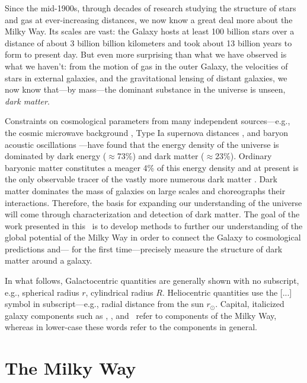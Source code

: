 Since the mid-1900s, through decades of research studying the structure of stars
and gas at ever-increasing distances, we now know a great deal more about the
Milky Way. Its scales are vast: the Galaxy hosts at least 100 billion stars over
a distance of about 3 billion billion kilometers and took about 13 billion years
to form to present day. But even more surprising than what we have observed is
what we haven't: from the motion of gas in the outer Galaxy, the velocities of
stars in external galaxies, and the gravitational lensing of distant galaxies,
we now know that---by mass---the dominant substance in the universe is unseen,
\emph{dark matter}.

Constraints on cosmological parameters from many independent sources---e.g., the
cosmic microwave background \citep{planck15}, Type Ia supernova distances
\citep{riess98, perlmutter99}, and baryon acoustic oscillations
\citep{eisenstein05}---have found that the energy density of the universe is
dominated by dark energy ($\approx$73\%) and dark matter ($\approx$23\%).
Ordinary baryonic matter constitutes a meager 4\% of this energy density and at
present is the only observable tracer of the vastly more numerous dark matter
\citep[though the search for the dark matter particle is
underway;][]{aprile11,luxdm12}. Dark matter dominates the mass of galaxies on
large scales and choreographs their interactions. Therefore, the basis for
expanding our understanding of the universe will come through characterization
and detection of dark matter. The goal of the work presented in this \article\
is to develop methods to further our understanding of the global potential of
the Milky Way in order to connect the Galaxy to cosmological predictions and---
for the first time---precisely measure the structure of dark matter around a
galaxy.


In what follows, Galactocentric quantities are generally shown with no
subscript, e.g., spherical radius $r$, cylindrical radius $R$. Heliocentric
quantities use the [...] symbol in subscript---e.g., radial distance from the
sun $r_\odot$. Capital, italicized galaxy components such as \mwdisk, \mwbulge,
and \mwhalo\ refer to components of the Milky Way, whereas in lower-case these
words refer to the components in general.

\section{The Milky Way} \label{sec:milkyway}


